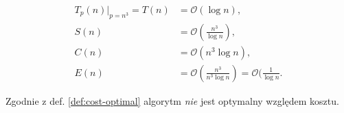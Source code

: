 \begin{align*}
T_p(n)|_{p=n^3} = T(n) &= \mathcal{O}(\log{n}), \\
S(n) &= \mathcal{O}(\frac{n^3}{\log{n}}), \\
C(n) &= \mathcal{O}(n^3 \log{n}), \\
E(n) &= \mathcal{O}(\frac{n^3}{n^3 \log{n}})=\mathcal{O}(\frac{1}{\log{n}}.
\end{align*}


Zgodnie z def. \ref{def:cost-optimal} algorytm \emph{nie} jest optymalny względem kosztu.



